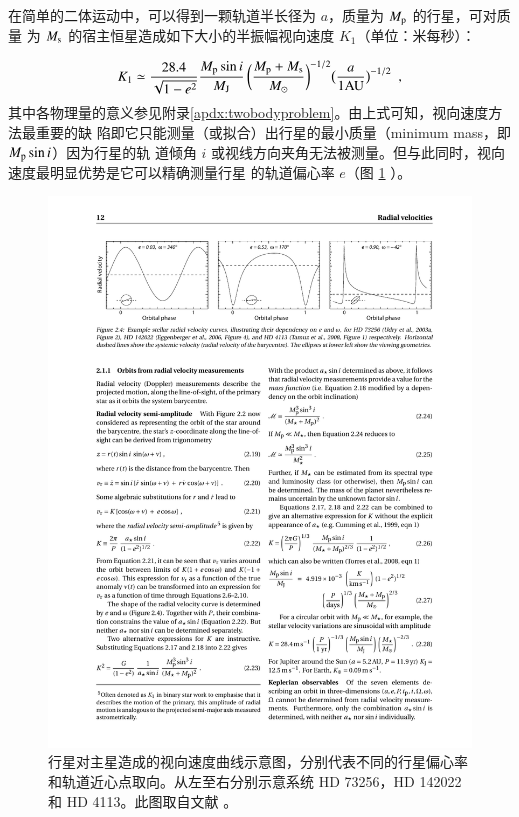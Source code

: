 在简单的二体运动中，可以得到一颗轨道半长径为 $a$，质量为 $M_\mathrm{p}$ 的行星，可对质量
为 $M_\mathrm{s}$ 的宿主恒星造成如下大小的半振幅视向速度 $K_1$（单位：米每秒）：

\begin{equation}  \label{eq:rvk} 
K_1 \simeq \frac{28.4 }{\sqrt{1-e^2}} \frac{M_\mathrm{p}\sin i}{M_\mathrm{J}} \, \bigg(\frac{M_\mathrm{p}+M_\mathrm{s}}{M_\odot}\bigg)^{-1/2} \big(\frac{a}{1 \mathrm{AU}}\big)^{-1/2} \ \ ,
\end{equation}  %
其中各物理量的意义参见附录\ref{apdx:twobodyproblem}。由上式可知，视向速度方法最重要的缺
陷即它只能测量（或拟合）出行星的最小质量（minimum mass，即$M_\mathrm{p}\sin i$）因为行星的轨
道倾角 $i$ 或视线方向夹角无法被测量。但与此同时，视向速度最明显优势是它可以精确测量行星
的轨道偏心率 $e$（图 \ref{fig:rvcurve} ）。

\begin{figure}[h!]
\centering
\includegraphics[width=1.0\textwidth]{figures/chapter1/fig5_rvcurve.pdf}
\caption[行星对主星造成的视向速度曲线示意图，从左至右分别代表不同的行星偏心率和轨道近心点取向。此图版权归 Perryman M. 所有。]{行星对主星造成的视向速度曲线示意图，分别代表不同的行星偏心率和轨道近心点取向。从左至右分别示意系统 HD 73256\cite{Udry2003HD73256}，HD 142022\cite{Eggenberger2006HD142022} 和 HD 4113\cite{Tamuz2008HD4113}。此图取自文献 。}
\label{fig:rvcurve}
\end{figure}

